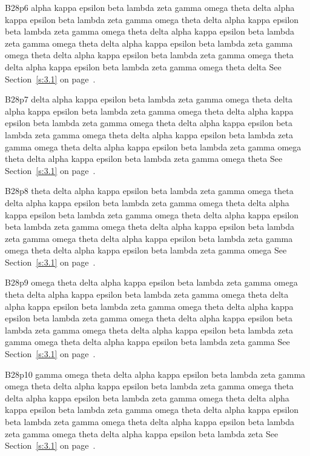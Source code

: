 B28p6 alpha kappa epsilon beta lambda zeta gamma omega theta delta alpha kappa epsilon beta lambda zeta gamma omega theta delta alpha kappa epsilon beta lambda zeta gamma omega theta delta alpha kappa epsilon beta lambda zeta gamma omega theta delta alpha kappa epsilon beta lambda zeta gamma omega theta delta alpha kappa epsilon beta lambda zeta gamma omega theta delta alpha kappa epsilon beta lambda zeta gamma omega theta delta See Section~\ref{s:3.1} on page~\pageref{s:3.1}.

B28p7 delta alpha kappa epsilon beta lambda zeta gamma omega theta delta alpha kappa epsilon beta lambda zeta gamma omega theta delta alpha kappa epsilon beta lambda zeta gamma omega theta delta alpha kappa epsilon beta lambda zeta gamma omega theta delta alpha kappa epsilon beta lambda zeta gamma omega theta delta alpha kappa epsilon beta lambda zeta gamma omega theta delta alpha kappa epsilon beta lambda zeta gamma omega theta See Section~\ref{s:3.1} on page~\pageref{s:3.1}.

B28p8 theta delta alpha kappa epsilon beta lambda zeta gamma omega theta delta alpha kappa epsilon beta lambda zeta gamma omega theta delta alpha kappa epsilon beta lambda zeta gamma omega theta delta alpha kappa epsilon beta lambda zeta gamma omega theta delta alpha kappa epsilon beta lambda zeta gamma omega theta delta alpha kappa epsilon beta lambda zeta gamma omega theta delta alpha kappa epsilon beta lambda zeta gamma omega See Section~\ref{s:3.1} on page~\pageref{s:3.1}.

B28p9 omega theta delta alpha kappa epsilon beta lambda zeta gamma omega theta delta alpha kappa epsilon beta lambda zeta gamma omega theta delta alpha kappa epsilon beta lambda zeta gamma omega theta delta alpha kappa epsilon beta lambda zeta gamma omega theta delta alpha kappa epsilon beta lambda zeta gamma omega theta delta alpha kappa epsilon beta lambda zeta gamma omega theta delta alpha kappa epsilon beta lambda zeta gamma See Section~\ref{s:3.1} on page~\pageref{s:3.1}.

B28p10 gamma omega theta delta alpha kappa epsilon beta lambda zeta gamma omega theta delta alpha kappa epsilon beta lambda zeta gamma omega theta delta alpha kappa epsilon beta lambda zeta gamma omega theta delta alpha kappa epsilon beta lambda zeta gamma omega theta delta alpha kappa epsilon beta lambda zeta gamma omega theta delta alpha kappa epsilon beta lambda zeta gamma omega theta delta alpha kappa epsilon beta lambda zeta See Section~\ref{s:3.1} on page~\pageref{s:3.1}.

